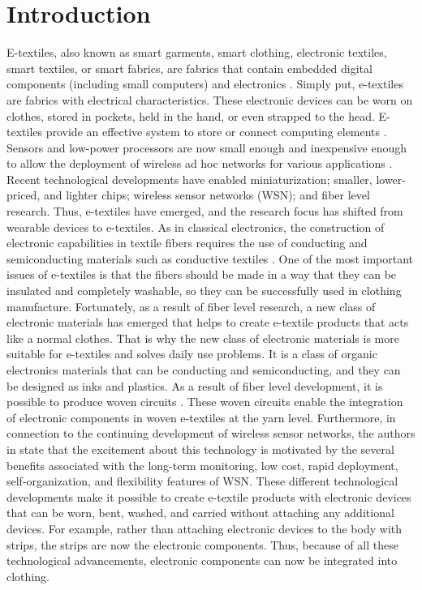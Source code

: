 \chapter{Introduction}
\label{chapter:Introduction}



	E-textiles, also known as smart garments, smart clothing, electronic textiles, smart textiles, or smart fabrics, are fabrics that contain embedded digital components (including small computers) and electronics \cite{1}. Simply put, e-textiles are fabrics with electrical characteristics. These electronic devices can be worn on clothes, stored in pockets, held in the hand, or even strapped to the head. E-textiles provide an effective system to store or connect computing elements \cite{12}. 
\\ 
Sensors and low-power processors are now small enough and inexpensive enough to allow the deployment of wireless ad hoc networks for various applications \cite{11}. Recent technological developments have enabled miniaturization; smaller, lower-priced, and lighter chips; wireless sensor networks (WSN); and fiber level research. Thus, e-textiles have emerged, and the research focus has shifted from wearable devices to e-textiles. As in classical electronics, the construction of electronic capabilities in textile fibers requires the use of conducting and semiconducting materials such as conductive textiles \cite{1}. One of the most important issues of e-textiles is that the fibers should be made in a way that they can be insulated and completely washable, so they can be successfully used in clothing manufacture. Fortunately, as a result of fiber level research, a new class of electronic materials has emerged that helps to create e-textile products that acts like a normal clothes. That is why the new class of electronic materials is more suitable for e-textiles and solves daily use problems. It is a class of organic electronics materials that can be conducting and semiconducting, and they can be designed as inks and plastics. As a result of fiber level development, it is possible to produce woven circuits \cite{4}. These woven circuits enable the integration of electronic components in woven e-textiles at the yarn level. Furthermore, in connection to the continuing development of wireless sensor networks, the authors in \cite{9} state that the excitement about this technology is motivated by the several benefits associated with the long-term monitoring, low cost, rapid deployment, self-organization, and flexibility features of WSN. These different technological developments make it possible to create e-textile products with electronic devices that can be worn, bent, washed, and carried without attaching any additional devices. For example, rather than attaching electronic devices to the body with strips, the strips are now the electronic components. Thus, because of all these technological advancements, electronic components can now be integrated into clothing. 
